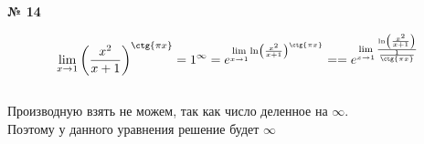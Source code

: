 \documentclass{article}
\begin{document}
\textbf{№ 14} 

\begingroup
\Large

$$ \lim_{x\to 1} \left( \frac{x^2}{x+1} \right)^{\ctg{\pi x}}
= 1^{\infty} 
= e^{\lim\limits_{x\to 1} \ln \left( \frac{x^2}{x+1} \right)^{\ctg{\pi x}} }
= = e^{\lim\limits_{x\to 1} \frac{\ln \left( \frac{x^2}{x+1} \right)}{\frac{1}{{\ctg{\pi x}}}} } $$
\\
Производную взять не можем, так как число деленное на $\infty$.\\
Поэтому у данного уравнения решение будет $\infty$


\endgroup
\end{document}
